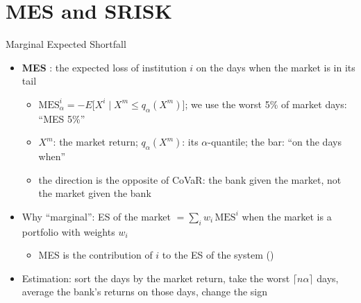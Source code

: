 \section{MES and SRISK}

\begin{frame}{Marginal Expected Shortfall}
\itemsize{\small}
\begin{itemize}
    \item \textbf{MES} : the expected loss of institution $i$ on the days when the market is in its tail
    \begin{itemize}
        \item $\mathrm{MES}^i_\alpha = -E\big[X^i \mid X^m \le q_\alpha(X^m)\big]$; we use the worst 5\% of market days: ``MES 5\%''
        \item $X^m$: the market return; $q_\alpha(X^m)$: its $\alpha$-quantile; the bar: ``on the days when''
        \item the direction is the opposite of CoVaR: the bank given the market, not the market given the bank
    \end{itemize}
    \item Why ``marginal'': ES of the market $= \sum_i w_i\,\mathrm{MES}^i$ when the market is a portfolio with weights $w_i$
    \begin{itemize}
        \item MES is the contribution of $i$ to the ES of the system ()
    \end{itemize}
    \item Estimation: sort the days by the market return, take the worst $\lceil n\alpha \rceil$ days, average the bank's returns on those days, change the sign
\end{itemize}
\end{frame}

